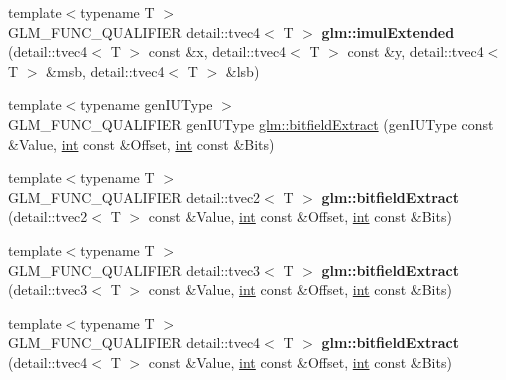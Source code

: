 \begin{DoxyCompactItemize}
\item 
\hypertarget{namespaceglm_ae71642a7ba52d6fa07a85c42bd53490b}{}{\footnotesize template$<$typename T $>$ }\\G\+L\+M\+\_\+\+F\+U\+N\+C\+\_\+\+Q\+U\+A\+L\+I\+F\+I\+E\+R detail\+::tvec4$<$ T $>$ {\bfseries glm\+::imul\+Extended} (detail\+::tvec4$<$ T $>$ const \&x, detail\+::tvec4$<$ T $>$ const \&y, detail\+::tvec4$<$ T $>$ \&msb, detail\+::tvec4$<$ T $>$ \&lsb)\label{namespaceglm_ae71642a7ba52d6fa07a85c42bd53490b}

\item 
{\footnotesize template$<$typename gen\+I\+U\+Type $>$ }\\G\+L\+M\+\_\+\+F\+U\+N\+C\+\_\+\+Q\+U\+A\+L\+I\+F\+I\+E\+R gen\+I\+U\+Type \hyperlink{group__core__func__integer_ga251d309beb171bf95117d2c301b2ad8b}{glm\+::bitfield\+Extract} (gen\+I\+U\+Type const \&Value, \hyperlink{_s_d_l__thread_8h_a6a64f9be4433e4de6e2f2f548cf3c08e}{int} const \&Offset, \hyperlink{_s_d_l__thread_8h_a6a64f9be4433e4de6e2f2f548cf3c08e}{int} const \&Bits)
\item 
\hypertarget{namespaceglm_a62e1ddc745fb24a1aab7a76a2ffd3a33}{}{\footnotesize template$<$typename T $>$ }\\G\+L\+M\+\_\+\+F\+U\+N\+C\+\_\+\+Q\+U\+A\+L\+I\+F\+I\+E\+R detail\+::tvec2$<$ T $>$ {\bfseries glm\+::bitfield\+Extract} (detail\+::tvec2$<$ T $>$ const \&Value, \hyperlink{_s_d_l__thread_8h_a6a64f9be4433e4de6e2f2f548cf3c08e}{int} const \&Offset, \hyperlink{_s_d_l__thread_8h_a6a64f9be4433e4de6e2f2f548cf3c08e}{int} const \&Bits)\label{namespaceglm_a62e1ddc745fb24a1aab7a76a2ffd3a33}

\item 
\hypertarget{namespaceglm_ab98cc1758f2f503a01d7e501130cd65f}{}{\footnotesize template$<$typename T $>$ }\\G\+L\+M\+\_\+\+F\+U\+N\+C\+\_\+\+Q\+U\+A\+L\+I\+F\+I\+E\+R detail\+::tvec3$<$ T $>$ {\bfseries glm\+::bitfield\+Extract} (detail\+::tvec3$<$ T $>$ const \&Value, \hyperlink{_s_d_l__thread_8h_a6a64f9be4433e4de6e2f2f548cf3c08e}{int} const \&Offset, \hyperlink{_s_d_l__thread_8h_a6a64f9be4433e4de6e2f2f548cf3c08e}{int} const \&Bits)\label{namespaceglm_ab98cc1758f2f503a01d7e501130cd65f}

\item 
\hypertarget{namespaceglm_a63dec2549abeb2193447b216e8f06158}{}{\footnotesize template$<$typename T $>$ }\\G\+L\+M\+\_\+\+F\+U\+N\+C\+\_\+\+Q\+U\+A\+L\+I\+F\+I\+E\+R detail\+::tvec4$<$ T $>$ {\bfseries glm\+::bitfield\+Extract} (detail\+::tvec4$<$ T $>$ const \&Value, \hyperlink{_s_d_l__thread_8h_a6a64f9be4433e4de6e2f2f548cf3c08e}{int} const \&Offset, \hyperlink{_s_d_l__thread_8h_a6a64f9be4433e4de6e2f2f548cf3c08e}{int} const \&Bits)\label{namespaceglm_a63dec2549abeb2193447b216e8f06158}


\end{DoxyCompactItemize}
